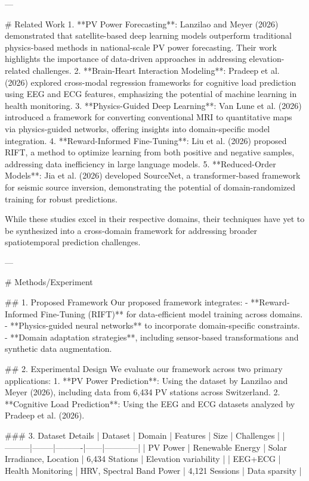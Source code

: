 ---

# Related Work  
1. **PV Power Forecasting**: Lanzilao and Meyer (2026) demonstrated that satellite-based deep learning models outperform traditional physics-based methods in national-scale PV power forecasting. Their work highlights the importance of data-driven approaches in addressing elevation-related challenges.  
2. **Brain-Heart Interaction Modeling**: Pradeep et al. (2026) explored cross-modal regression frameworks for cognitive load prediction using EEG and ECG features, emphasizing the potential of machine learning in health monitoring.  
3. **Physics-Guided Deep Learning**: Van Lune et al. (2026) introduced a framework for converting conventional MRI to quantitative maps via physics-guided networks, offering insights into domain-specific model integration.  
4. **Reward-Informed Fine-Tuning**: Liu et al. (2026) proposed RIFT, a method to optimize learning from both positive and negative samples, addressing data inefficiency in large language models.  
5. **Reduced-Order Models**: Jia et al. (2026) developed SourceNet, a transformer-based framework for seismic source inversion, demonstrating the potential of domain-randomized training for robust predictions.  

While these studies excel in their respective domains, their techniques have yet to be synthesized into a cross-domain framework for addressing broader spatiotemporal prediction challenges.  

---

# Methods/Experiment  

## 1. Proposed Framework  
Our proposed framework integrates:  
- **Reward-Informed Fine-Tuning (RIFT)** for data-efficient model training across domains.  
- **Physics-guided neural networks** to incorporate domain-specific constraints.  
- **Domain adaptation strategies**, including sensor-based transformations and synthetic data augmentation.  

## 2. Experimental Design  
We evaluate our framework across two primary applications:  
1. **PV Power Prediction**: Using the dataset by Lanzilao and Meyer (2026), including data from 6,434 PV stations across Switzerland.  
2. **Cognitive Load Prediction**: Using the EEG and ECG datasets analyzed by Pradeep et al. (2026).  

### 3. Dataset Details  
| Dataset | Domain | Features | Size | Challenges |  
|---------|--------|----------|------|------------|  
| PV Power | Renewable Energy | Solar Irradiance, Location | 6,434 Stations | Elevation variability |  
| EEG+ECG | Health Monitoring | HRV, Spectral Band Power | 4,121 Sessions | Data sparsity |  

